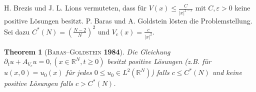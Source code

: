\documentclass{beamer}
\newtheorem{thm}{Theorem}
\theoremstyle{break}
\begin{document}
\begin{frame}
H. Brezis und J. L. Lions vermuteten, dass f\"ur $V(x) \le \frac{C}{|x|^{2-\varepsilon}}$ mit $C, \varepsilon>0$ keine positive L\"osungen besitzt. P. Baras und A. Goldstein l\"osten die Problemstellung.  Sei dazu $C^*(N)=( \tfrac{N-2}{N} )^2$ und $V_c(x) = \frac{c}{|x|^2}$. \vspace{.25cm}

\begin{thm}[\textsc{Baras--Goldstein} \textbf{1984}]\label{main}
Die Gleichung  $\partial_t u + A_{V_c} u =0, (x\in \mathbb R^N, t\ge0)$ besitzt positive L\"osungen (z.B. f\"ur $u(x,0)=u_0(x)$ f\"ur jedes $0\le u_0\in L^2(\mathbb R^N)$) falls $c\le C^*(N)$ und keine positive L\"osungen falls $c>C^*(N)$.
\end{thm}
\end{frame}
\end{document}
